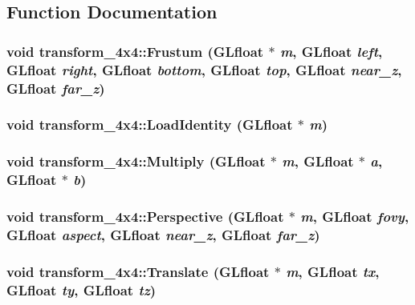 \subsection{Function Documentation}
\hypertarget{namespacetransform__4x4_a581de72ba4913dbb2a8a85cab5882a28}{
\subsubsection[{Frustum}]{\setlength{\rightskip}{0pt plus 5cm}void transform\_\-4x4::Frustum (GLfloat $\ast$ {\em m}, \/  GLfloat {\em left}, \/  GLfloat {\em right}, \/  GLfloat {\em bottom}, \/  GLfloat {\em top}, \/  GLfloat {\em near\_\-z}, \/  GLfloat {\em far\_\-z})}}
\label{namespacetransform__4x4_a581de72ba4913dbb2a8a85cab5882a28}
\hypertarget{namespacetransform__4x4_a292d65d7bd5a944aae8f7e1dc4bebc77}{
\subsubsection[{LoadIdentity}]{\setlength{\rightskip}{0pt plus 5cm}void transform\_\-4x4::LoadIdentity (GLfloat $\ast$ {\em m})}}
\label{namespacetransform__4x4_a292d65d7bd5a944aae8f7e1dc4bebc77}
\hypertarget{namespacetransform__4x4_a003d8210c29ad26745f4a0fcd24a6dbe}{
\subsubsection[{Multiply}]{\setlength{\rightskip}{0pt plus 5cm}void transform\_\-4x4::Multiply (GLfloat $\ast$ {\em m}, \/  GLfloat $\ast$ {\em a}, \/  GLfloat $\ast$ {\em b})}}
\label{namespacetransform__4x4_a003d8210c29ad26745f4a0fcd24a6dbe}
\hypertarget{namespacetransform__4x4_a67de7f42889f0ff1f097fe5a6ee740a8}{
\subsubsection[{Perspective}]{\setlength{\rightskip}{0pt plus 5cm}void transform\_\-4x4::Perspective (GLfloat $\ast$ {\em m}, \/  GLfloat {\em fovy}, \/  GLfloat {\em aspect}, \/  GLfloat {\em near\_\-z}, \/  GLfloat {\em far\_\-z})}}
\label{namespacetransform__4x4_a67de7f42889f0ff1f097fe5a6ee740a8}
\hypertarget{namespacetransform__4x4_afd7c145427052a8736d91ef09b4aa86b}{
\subsubsection[{Translate}]{\setlength{\rightskip}{0pt plus 5cm}void transform\_\-4x4::Translate (GLfloat $\ast$ {\em m}, \/  GLfloat {\em tx}, \/  GLfloat {\em ty}, \/  GLfloat {\em tz})}}
\label{namespacetransform__4x4_afd7c145427052a8736d91ef09b4aa86b}
